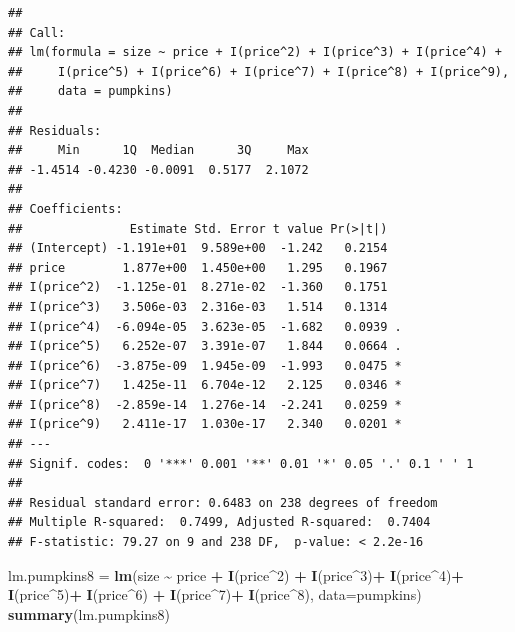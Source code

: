 \documentclass[
]{book}
\newenvironment{Shaded}{\begin{snugshade}}{\end{snugshade}}
\newcommand{\AttributeTok}[1]{\textcolor[rgb]{0.13,0.29,0.53}{#1}}
\newcommand{\DecValTok}[1]{\textcolor[rgb]{0.00,0.00,0.81}{#1}}
\newcommand{\FunctionTok}[1]{\textcolor[rgb]{0.13,0.29,0.53}{\textbf{#1}}}
\newcommand{\NormalTok}[1]{#1}
\newcommand{\OtherTok}[1]{\textcolor[rgb]{0.56,0.35,0.01}{#1}}
\newcommand{\SpecialCharTok}[1]{\textcolor[rgb]{0.81,0.36,0.00}{\textbf{#1}}}
\begin{document}
\begin{verbatim}
## 
## Call:
## lm(formula = size ~ price + I(price^2) + I(price^3) + I(price^4) + 
##     I(price^5) + I(price^6) + I(price^7) + I(price^8) + I(price^9), 
##     data = pumpkins)
## 
## Residuals:
##     Min      1Q  Median      3Q     Max 
## -1.4514 -0.4230 -0.0091  0.5177  2.1072 
## 
## Coefficients:
##               Estimate Std. Error t value Pr(>|t|)  
## (Intercept) -1.191e+01  9.589e+00  -1.242   0.2154  
## price        1.877e+00  1.450e+00   1.295   0.1967  
## I(price^2)  -1.125e-01  8.271e-02  -1.360   0.1751  
## I(price^3)   3.506e-03  2.316e-03   1.514   0.1314  
## I(price^4)  -6.094e-05  3.623e-05  -1.682   0.0939 .
## I(price^5)   6.252e-07  3.391e-07   1.844   0.0664 .
## I(price^6)  -3.875e-09  1.945e-09  -1.993   0.0475 *
## I(price^7)   1.425e-11  6.704e-12   2.125   0.0346 *
## I(price^8)  -2.859e-14  1.276e-14  -2.241   0.0259 *
## I(price^9)   2.411e-17  1.030e-17   2.340   0.0201 *
## ---
## Signif. codes:  0 '***' 0.001 '**' 0.01 '*' 0.05 '.' 0.1 ' ' 1
## 
## Residual standard error: 0.6483 on 238 degrees of freedom
## Multiple R-squared:  0.7499, Adjusted R-squared:  0.7404 
## F-statistic: 79.27 on 9 and 238 DF,  p-value: < 2.2e-16
\end{verbatim}

\begin{Shaded}
\begin{Highlighting}[]
\NormalTok{lm.pumpkins8 }\OtherTok{=}  \FunctionTok{lm}\NormalTok{(size }\SpecialCharTok{\textasciitilde{}}\NormalTok{ price }\SpecialCharTok{+} \FunctionTok{I}\NormalTok{(price}\SpecialCharTok{\^{}}\DecValTok{2}\NormalTok{) }\SpecialCharTok{+} \FunctionTok{I}\NormalTok{(price}\SpecialCharTok{\^{}}\DecValTok{3}\NormalTok{)}\SpecialCharTok{+} \FunctionTok{I}\NormalTok{(price}\SpecialCharTok{\^{}}\DecValTok{4}\NormalTok{)}\SpecialCharTok{+} \FunctionTok{I}\NormalTok{(price}\SpecialCharTok{\^{}}\DecValTok{5}\NormalTok{)}\SpecialCharTok{+} \FunctionTok{I}\NormalTok{(price}\SpecialCharTok{\^{}}\DecValTok{6}\NormalTok{) }\SpecialCharTok{+} \FunctionTok{I}\NormalTok{(price}\SpecialCharTok{\^{}}\DecValTok{7}\NormalTok{)}\SpecialCharTok{+} \FunctionTok{I}\NormalTok{(price}\SpecialCharTok{\^{}}\DecValTok{8}\NormalTok{), }\AttributeTok{data=}\NormalTok{pumpkins)}
\FunctionTok{summary}\NormalTok{(lm.pumpkins8)}
\end{Highlighting}
\end{Shaded}
\end{document}
